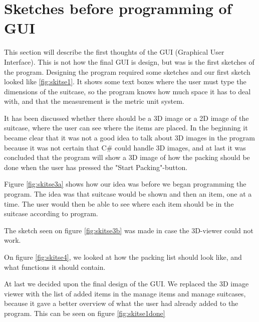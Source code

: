 \section{Sketches before programming of GUI}
This section will describe the first thoughts of the GUI (Graphical User Interface). This is not how the final GUI is design, but was is the first sketches of the program.
Designing the program required some sketches and our first sketch looked like \ref{fig:skitse1}.
It shows some text boxes where the user must type the dimensions of the suitcase, so the program knows how much space it has to deal with, and that the measurement is the metric unit system.


It has been discussed whether there should be a 3D image or a 2D image of the suitcase, where the user can see where the items are placed. In the beginning it became clear that it was not a good idea to talk about 3D images in the program because it was not certain that C\# could handle 3D images, and at last it was concluded that the program will show a 3D image of how the packing should be done when the user has pressed the "Start Packing"-button.

Figure \ref{fig:skitse3a} shows how our idea was before we began programming the program. The idea was that suitcase would be shown and then an item, one at a time. The user would then be able to see where each item should be in the suitcase according to program.


The sketch seen on figure \ref{fig:skitse3b} was made in case the 3D-viewer could not work.

On figure \ref{fig:skitse4}, we looked at how the packing list should look like, and what functions it should contain.


At last we decided upon the final design of the GUI. We replaced the 3D image viewer with the list of added items in the manage items and manage suitcases, because it gave a better overview of what the user had already added to the program. This can be seen on figure \ref{fig:skitse1done} 


